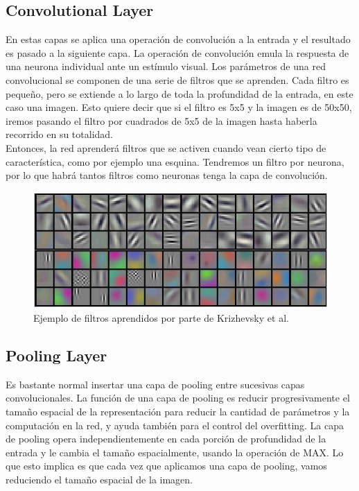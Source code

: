 \subsection{Convolutional Layer}

En estas capas se aplica una operación de convolución a la entrada y el resultado es pasado a la siguiente capa. La operación de convolución emula la respuesta de una neurona individual ante un estímulo visual. Los parámetros de una red convolucional se componen de una serie de filtros que se aprenden. Cada filtro es pequeño, pero se extiende a lo largo de toda la profundidad de la entrada, en este caso una imagen. Esto quiere decir que si el filtro es 5x5 y la imagen es de 50x50, iremos pasando el filtro por cuadrados de 5x5 de la imagen hasta haberla recorrido en su totalidad.\\

Entonces, la red aprenderá filtros que se activen cuando vean cierto tipo de característica, como por ejemplo una esquina. Tendremos un filtro por neurona, por lo que habrá tantos filtros como neuronas tenga la capa de convolución.\\

\begin{figure}[H]
	\centering
	\caption{Ejemplo de filtros aprendidos por parte de Krizhevsky et al.}
    \includegraphics[width=\textwidth]{./imagenes//weights.jpeg}
\end{figure}

\subsection{Pooling Layer}
Es bastante normal insertar una capa de pooling entre sucesivas capas convolucionales. La función de una capa de pooling es reducir progresivamente el tamaño espacial de la representación para reducir la cantidad de parámetros y la computación en la red, y ayuda también para el control del overfitting. La capa de pooling opera independientemente en cada porción de profundidad de la entrada y le cambia el tamaño espacialmente, usando la operación de MAX. Lo que esto implica es que cada vez que aplicamos una capa de pooling, vamos reduciendo el tamaño espacial de la imagen.\\

